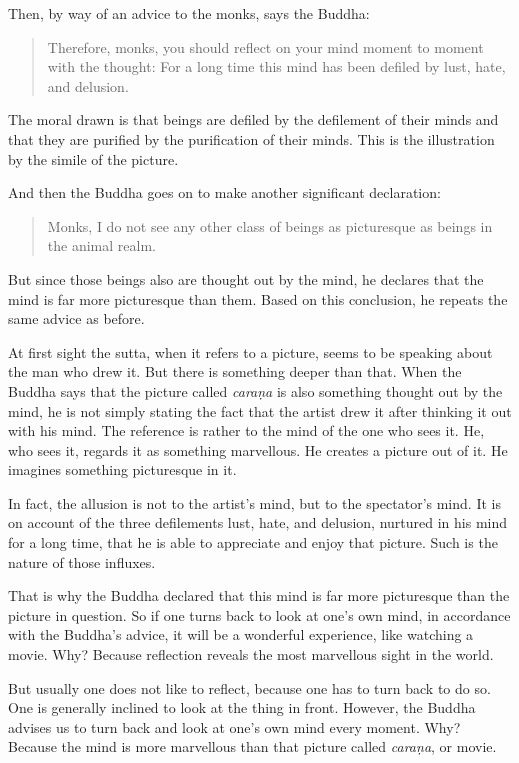 Then, by way of an advice to the monks, says the Buddha:

\begin{quote}
Therefore, monks, you should reflect on your mind moment to moment with the thought: For a long time this mind has been defiled by lust, hate, and delusion.
\end{quote}

The moral drawn is that beings are defiled by the defilement of their minds and that they are purified by the purification of their minds. This is the illustration by the simile of the picture.

And then the Buddha goes on to make another significant declaration:

\begin{quote}
Monks, I do not see any other class of beings as picturesque as beings in the animal realm.
\end{quote}

But since those beings also are thought out by the mind, he declares that the mind is far more picturesque than them. Based on this conclusion, he repeats the same advice as before.

At first sight the sutta, when it refers to a picture, seems to be speaking about the man who drew it. But there is something deeper than that. When the Buddha says that the picture called \emph{caraṇa} is also something thought out by the mind, he is not simply stating the fact that the artist drew it after thinking it out with his mind. The reference is rather to the mind of the one who sees it. He, who sees it, regards it as something marvellous. He creates a picture out of it. He imagines something picturesque in it.

In fact, the allusion is not to the artist's mind, but to the spectator's mind. It is on account of the three defilements lust, hate, and delusion, nurtured in his mind for a long time, that he is able to appreciate and enjoy that picture. Such is the nature of those influxes.

That is why the Buddha declared that this mind is far more picturesque than the picture in question. So if one turns back to look at one's own mind, in accordance with the Buddha's advice, it will be a wonderful experience, like watching a movie. Why? Because reflection reveals the most marvellous sight in the world.

But usually one does not like to reflect, because one has to turn back to do so. One is generally inclined to look at the thing in front. However, the Buddha advises us to turn back and look at one's own mind every moment. Why? Because the mind is more marvellous than that picture called \emph{caraṇa}, or movie.

